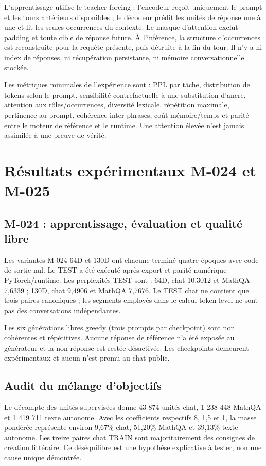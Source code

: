 \documentclass[11pt,a4paper]{report}
\begin{document}
L'apprentissage utilise le teacher forcing : l'encodeur reçoit uniquement le prompt et les tours antérieurs disponibles ; le décodeur prédit les unités de réponse une à une et lit les seules occurrences du contexte. Le masque d'attention exclut padding et toute cible de réponse future. À l'inférence, la structure d'occurrences est reconstruite pour la requête présente, puis détruite à la fin du tour. Il n'y a ni index de réponses, ni récupération persistante, ni mémoire conversationnelle stockée.

Les métriques minimales de l'expérience sont : PPL par tâche, distribution de tokens selon le prompt, sensibilité contrefactuelle à une substitution d'ancre, attention aux rôles/occurrences, diversité lexicale, répétition maximale, pertinence au prompt, cohérence inter-phrases, coût mémoire/temps et parité entre le moteur de référence et le runtime. Une attention élevée n'est jamais assimilée à une preuve de vérité.


\section{Résultats expérimentaux M-024 et M-025}
\subsection{M-024 : apprentissage, évaluation et qualité libre}
Les variantes M-024 64D et 130D ont chacune terminé quatre époques avec code de sortie nul. Le TEST a été exécuté après export et parité numérique PyTorch/runtime. Les perplexités TEST sont : 64D, chat 10,3012 et MathQA 7,6339 ; 130D, chat 9,4906 et MathQA 7,7676. Le TEST chat ne contient que trois paires canoniques ; les segments employés dans le calcul token-level ne sont pas des conversations indépendantes.

Les six générations libres greedy (trois prompts par checkpoint) sont non cohérentes et répétitives. Aucune réponse de référence n'a été exposée au générateur et la non-réponse est restée désactivée. Les checkpoints demeurent expérimentaux et aucun n'est promu au chat public.

\subsection{Audit du mélange d'objectifs}
Le décompte des unités supervisées donne 43 874 unités chat, 1 238 448 MathQA et 1 419 711 texte autonome. Avec les coefficients respectifs 8, 1,5 et 1, la masse pondérée représente environ 9,67\% chat, 51,20\% MathQA et 39,13\% texte autonome. Les treize paires chat TRAIN sont majoritairement des consignes de création littéraire. Ce déséquilibre est une hypothèse explicative à tester, non une cause unique démontrée.
\end{document}
